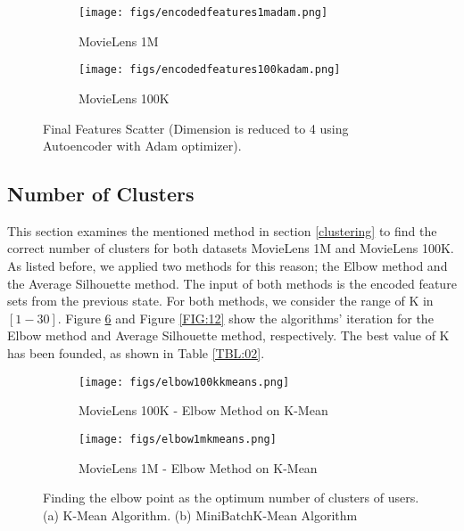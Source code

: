 \documentclass[a4paper,fleqn]{cas-dc}
\begin{document}
\begin{figure}
	\centering

	\begin{subfigure}{0.25\textwidth}
		\centering
		\texttt{[image: figs/encodedfeatures1madam.png]}
		\caption{MovieLens 1M}
		\label{fig10:sfig1}
	\end{subfigure}\begin{subfigure}{0.25\textwidth}
		\centering
		\texttt{[image: figs/encodedfeatures100kadam.png]}
		\caption{MovieLens 100K}
		\label{fig10:sfig2}
	\end{subfigure}

	\caption{Final Features Scatter (Dimension is reduced to 4 using Autoencoder with Adam optimizer).}
	\label{FIG:10}
\end{figure}


\subsection{Number of Clusters}
\label{test:clustering}
This section examines the mentioned method in section \ref{clustering} to find the correct number of clusters for both datasets MovieLens 1M and MovieLens 100K. As listed before, we applied two methods for this reason; the Elbow method and the Average Silhouette method. The input of both methods is the encoded feature sets from the previous state. For both methods, we consider the range of K in $[1-30]$. Figure \ref{FIG:11} and Figure \ref{FIG:12} show the algorithms' iteration for the Elbow method and Average Silhouette method, respectively. The best value of K has been founded, as shown in Table \ref{TBL:02}.

\begin{figure}

	\begin{subfigure}{.5\textwidth}
		\centering
		\texttt{[image: figs/elbow100kkmeans.png]}
		\caption{MovieLens 100K - Elbow Method on K-Mean}
		\label{fig:sfig1}
	\end{subfigure}
	\begin{subfigure}{.5\textwidth}
		\centering
		\texttt{[image: figs/elbow1mkmeans.png]}
		\caption{MovieLens 1M - Elbow Method on K-Mean}
		\label{fig:sfig1}
	\end{subfigure}

	\caption{Finding the elbow point as the optimum number of clusters of users. (a) K-Mean Algorithm. (b) MiniBatchK-Mean Algorithm}
	\label{FIG:11}
\end{figure}
\end{document}
